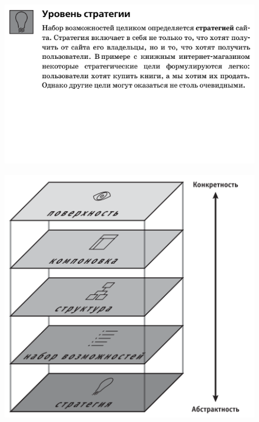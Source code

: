 \documentclass{beamer}
\begin{document}
\begin{frame}
\begin{figure}[h]
\centering
\includegraphics[scale=0.7]{images/lec01-pic06.png}
\end{figure}
\end{frame}

\begin{frame}
\begin{figure}[h]
\centering
\includegraphics[scale=0.7]{images/lec01-pic07.png}
\end{figure}
\end{frame}
\end{document}
